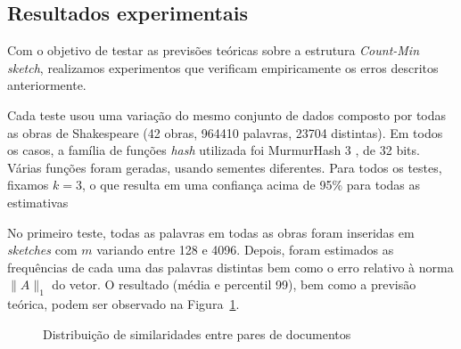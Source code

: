 \subsection{Resultados experimentais}\label{sec:count:experiments}

Com o objetivo de testar as previsões teóricas sobre a estrutura \emph{Count-Min sketch}, realizamos experimentos que verificam empiricamente os erros descritos anteriormente.

Cada teste usou uma variação do mesmo conjunto de dados composto por todas as obras de Shakespeare (42 obras, 964410 palavras, 23704 distintas). Em todos os casos, a família de funções \emph{hash} utilizada foi MurmurHash 3 \cite{appleby2012murmur}, de 32 bits. Várias funções foram geradas, usando sementes diferentes. Para todos os testes, fixamos $k=3$, o que resulta em uma confiança acima de 95\% para todas as estimativas

No primeiro teste, todas as palavras em todas as obras foram inseridas em \emph{sketches} com $m$ variando entre 128 e 4096. Depois, foram estimados as frequências de cada uma das palavras distintas bem como o erro relativo à norma $\lVert A \rVert_1$ do vetor. O resultado (média e percentil 99), bem como a previsão teórica, podem ser observado na Figura~\ref{fig:countmin_result}.

\begin{figure}[!htbp]
\centering
{}
\caption{Distribuição de similaridades entre pares de documentos}
\label{fig:countmin_result}
\end{figure}

